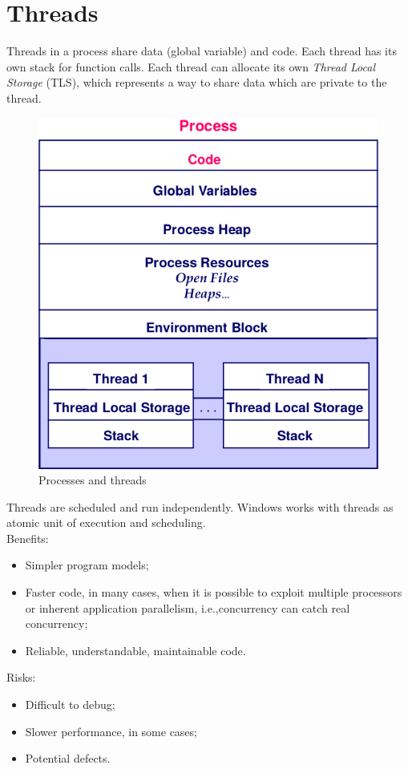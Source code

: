 \chapter{Threads}
Threads in a process share data (global variable) and code. Each thread has its own stack for function calls. Each thread can allocate its own \emph{Thread Local Storage} (TLS), which represents a way to share data which are private to the thread.

\begin{figure}[hbtp]
\centering
\includegraphics[scale=0.35]{images/windows_threads/process_threads.png}
\caption{Processes and threads}
\end{figure}

Threads are scheduled and run independently. Windows works with threads as atomic unit of execution and scheduling.
\\
Benefits:
\begin{itemize}
\item Simpler program models;
\item Faster code, in many cases, when it is possible to exploit multiple processors or inherent application parallelism, i.e.,\@ concurrency can catch real concurrency;
\item Reliable, understandable, maintainable code.
\end{itemize}
Risks:
\begin{itemize}
\item Difficult to debug;
\item Slower performance, in some cases;
\item Potential defects.
\end{itemize}

